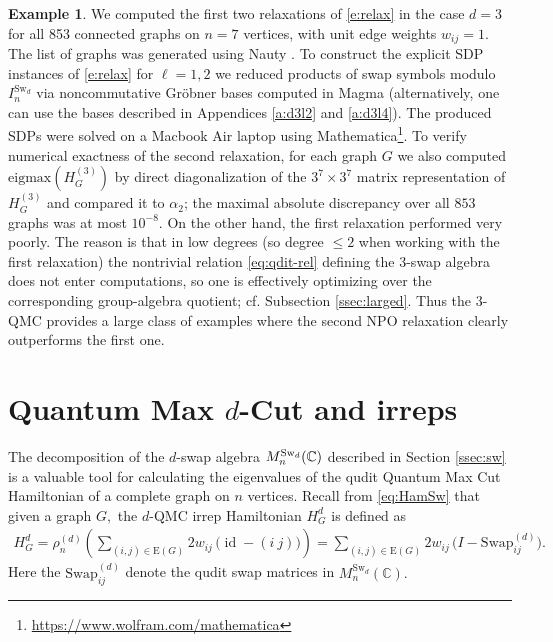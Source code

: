 \documentclass[12pt,dvipsnames,accepted=2016-08-18,a4paper,onecolumn]{quantumarticle}
\DeclareMathOperator{\id}{id}
\numberwithin{equation}{section}
\theoremstyle{definition}
\newtheorem{example}[theorem]{Example}
\begin{document}
\begin{example}
We computed the first two relaxations of \eqref{e:relax} in the case $d=3$ for all 853 connected graphs on $n=7$ vertices, with {unit edge weights} $w_{ij}=1$.
The list of graphs was generated using Nauty \cite{nauty}. 
To construct the explicit SDP instances 
of \eqref{e:relax}
for $\ell=1,2$ we reduced products of swap symbols
modulo $I_n^{\text{Sw}_d}$ via noncommutative Gr\"obner bases computed in
{Magma} \cite{magma} (alternatively, one can use the bases described in
Appendices \ref{a:d3l2} and \ref{a:d3l4}). 
The produced SDPs were solved 
on a Macbook Air laptop
using Mathematica\footnote{\url{https://www.wolfram.com/mathematica}}.
To verify numerical exactness of the second relaxation, for each graph $G$ we also computed
$\mathrm{eigmax}(H_G^{(3)})$ by {direct diagonalization} of the $3^7\times 3^7$ matrix
representation of $H_G^{(3)}$ and compared it to $\alpha_2$; the maximal absolute discrepancy
over all $853$ graphs was at most $10^{-8}$. 
On the other hand, the first relaxation performed very poorly. The reason is that in low degrees (so degree $\leq2$ when working with the first relaxation)
the nontrivial relation
\eqref{eq:qdit-rel} defining the $3$-swap algebra
does not enter computations, so one is effectively optimizing over the
corresponding group-algebra quotient; cf. Subsection \ref{ssec:larged}. 
Thus the $3$-QMC provides a large class of examples where the 
second NPO relaxation clearly outperforms the first one.
\end{example}


\section{Quantum Max $d$-Cut and irreps}\label{sec:6}

The decomposition of the $d$-swap algebra $M^{\text{\textnormal{Sw}}_d}_n(\mathbb{C})$ described in Section \ref{ssec:sw} is a valuable tool for calculating the eigenvalues of the qudit Quantum Max Cut Hamiltonian of a complete graph on $n$ vertices.
Recall from \eqref{eq:HamSw} that given a graph $G,$ 
the $d$-QMC irrep Hamiltonian $H_G^{d}$ is defined as 
	\begin{align*}
		H_G^{d} =   \rho_n^{(d)} \left(
		\sum_{(i,j) \in \text{E}(G)} 
		2w_{ij} \,\big(\id - (i\ j)\big)\right) =
		\sum_{(i,j) \in \text{E}(G)} 
		2w_{ij} \,\big(I - \text{Swap}^{(d)}_{ij}\big).
	\end{align*}
Here the $\text{Swap}^{(d)}_{ij}$ denote the qudit swap matrices in $M^{\text{Sw}_d}_n(\mathbb{C}).$
\end{document}
